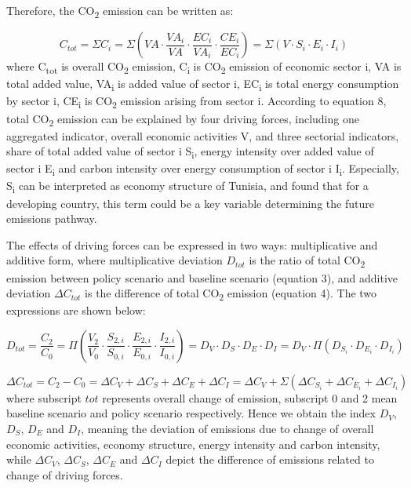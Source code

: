 \documentclass[
]{article}
\begin{document}
Therefore, the CO\textsubscript{2} emission can be written as:

\[  C_{tot} = \Sigma C_{i} = \Sigma( VA \cdot \frac{VA_{i}}{VA} \cdot \frac{EC_{i}}{VA_{i}} \cdot \frac{CE_{i}}{EC_{i}} )=  \Sigma( V \cdot S_{i} \cdot E_{i} \cdot I_{i}) \tag{2}\]
where C\textsubscript{tot} is overall CO\textsubscript{2} emission,
C\textsubscript{i} is CO\textsubscript{2} emission of economic sector i,
VA is total added value, VA\textsubscript{i} is added value of sector i,
EC\textsubscript{i} is total energy consumption by sector i,
CE\textsubscript{i} is CO\textsubscript{2} emission arising from sector
i. According to equation 8, total CO\textsubscript{2} emission can be
explained by four driving forces, including one aggregated indicator,
overall economic activities V, and three sectorial indicators, share of
total added value of sector i S\textsubscript{i}, energy intensity over
added value of sector i E\textsubscript{i} and carbon intensity over
energy consumption of sector i I\textsubscript{i}. Especially,
S\textsubscript{i} can be interpreted as economy structure of Tunisia,
\textcite{grubb2015} and \textcite{kanitkar2015} found that for a
developing country, this term could be a key variable determining the
future emissions pathway.

The effects of driving forces can be expressed in two ways:
multiplicative and additive form, where multiplicative deviation
\(D_{tot}\) is the ratio of total CO\textsubscript{2} emission between
policy scenario and baseline scenario (equation 3), and additive
deviation \(\Delta C_{tot}\) is the difference of total
CO\textsubscript{2} emission (equation 4). The two expressions are shown
below:

\[ D_{tot} =\frac{C_{2}}{C_{0}} = \Pi(\frac{V_{2}}{V_{0}} \cdot \frac{S_{2,i}}{S_{0,i}} \cdot \frac{E_{2,i}}{E_{0,i}}  \cdot \frac{I_{2,i}}{I_{0,i}}) = D_{V}  \cdot  D_{S} \cdot D_{E} \cdot D_{I} = D_{V}  \cdot \Pi ( D_{S_{i}} \cdot D_{E_{i}} \cdot D_{I_{i}}) \tag{3}\]

\[ \Delta C_{tot} = C_{2} - C_{0} = \Delta C_{V} + \Delta C_{S} + \Delta C_{E} + \Delta C_{I} = \Delta C_{V} + \Sigma( \Delta C_{S_{i}} + \Delta C_{E_{i}} + \Delta C_{I_{i}}) \tag{4}\]
where subscript \(tot\) represents overall change of emission, subscript
0 and 2 mean baseline scenario and policy scenario respectively. Hence
we obtain the index \(D_{V}\), \(D_{S}\), \(D_{E}\) and \(D_{I}\),
meaning the deviation of emissions due to change of overall economic
activities, economy structure, energy intensity and carbon intensity,
while \(\Delta C_{V}\), \(\Delta C_{S}\), \(\Delta C_{E}\) and
\(\Delta C_{I}\) depict the difference of emissions related to change of
driving forces.
\end{document}
